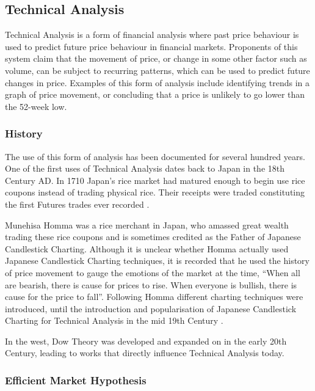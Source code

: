\documentclass{article}
\begin{document}
\subsection{Technical Analysis}

Technical Analysis is a form of financial analysis where past price behaviour is used to predict future price behaviour in financial markets. Proponents of this system claim that the movement of price, or change in some other factor such as volume, can be subject to recurring patterns, which can be used to predict future changes in price. Examples of this form of analysis include identifying trends in a graph of price movement, or concluding that a price is unlikely to go lower than the 52-week low.

\subsubsection{History}

The use of this form of analysis has been documented for several hundred years. One of the first uses of Technical Analysis dates back to Japan in the 18th Century AD. In 1710 Japan's rice market had matured enough to begin use rice coupons instead of trading physical rice. Their receipts were traded constituting the first Futures trades ever recorded \citep[p.15]{jcct1991}. 

Munehisa Homma was a rice merchant in Japan, who amassed great wealth trading these rice coupons and is sometimes credited as the Father of Japanese Candlestick Charting. Although it is unclear whether Homma actually used Japanese Candlestick Charting techniques, it is recorded that he used the history of price movement to gauge the emotions of the market at the time, ``When all are bearish, there is cause for prices to rise. When everyone is bullish, there is cause for the price to fall''. Following Homma different charting techniques were introduced, until the introduction and popularisation of Japanese Candlestick Charting for Technical Analysis in the mid 19th Century \citep[p.18]{jcct1994}.

In the west, Dow Theory was developed and expanded on in the early 20th Century, leading to works \citep{edwards2012technical} that directly influence Technical Analysis today.

\subsubsection{Efficient Market Hypothesis}
\end{document}
